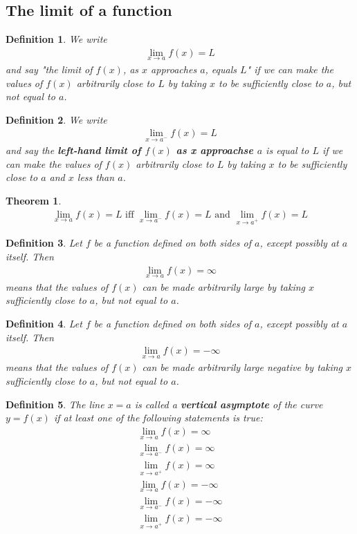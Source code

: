 \documentclass{article}
\theoremstyle{sltheorem}
\newtheorem{definition}{Definition}[section]
\newtheorem{theorem}{Theorem}[section]
\begin{document}
\subsection{The limit of a function}
\begin{definition}
    We write
    \begin{align*}
        \lim_{x\to a} f(x) = L
    \end{align*}
    and say "the limit of $f(x)$, as $x$ approaches $a$, equals $L$" if we can make the values of $f(x)$ arbitrarily close to $L$ by taking $x$ to be sufficiently close to $a$, but not equal to $a$.
\end{definition}
\begin{definition}
    We write
    \begin{align*}
        \lim_{x\to a^-}f(x) = L
    \end{align*}
    and say the \textbf{left-hand limit of $f(x)$ as x approachse $a$} is equal to $L$ if we can make the values of $f(x)$ arbitrarily close to $L$ by taking $x$ to be sufficiently close to $a$ and $x$ less than $a$. 
\end{definition}
\begin{theorem}
    \begin{align*}
        \lim_{x\to a}f(x) = L \text{ iff } \lim_{x\to a^-}f(x) = L \text{ and } \lim_{x\to a^+}f(x) = L
    \end{align*}
\end{theorem}
\begin{definition}
    Let $f$ be a function defined on both sides of $a$, except possibly at $a$ itself. Then
    \begin{align*}
        \lim_{x\to a} f(x) = \infty
    \end{align*}
    means that the values of $f(x)$ can be made arbitrarily large by taking $x$ sufficiently close to $a$, but not equal to $a$.
\end{definition}
\begin{definition}
    Let $f$ be a function defined on both sides of $a$, except possibly at $a$ itself. Then
    \begin{align*}
        \lim_{x\to a} f(x) = -\infty
    \end{align*}
    means that the values of $f(x)$ can be made arbitrarily large negative by taking $x$ sufficiently close to $a$, but not equal to $a$.
\end{definition}
\begin{definition}
    The line $x=a$ is called a \textbf{vertical asymptote} of the curve $y=f(x)$ if at least one of the following statements is true:
    \begin{align*}
        \lim_{x\to a}f(x) = \infty\\
        \lim_{x\to a^-}f(x) = \infty\\
        \lim_{x\to a^+}f(x) = \infty\\
        \lim_{x\to a}f(x) = -\infty\\
        \lim_{x\to a^-}f(x) = -\infty\\
        \lim_{x\to a^+}f(x) = -\infty
    \end{align*}
\end{definition}
\end{document}
